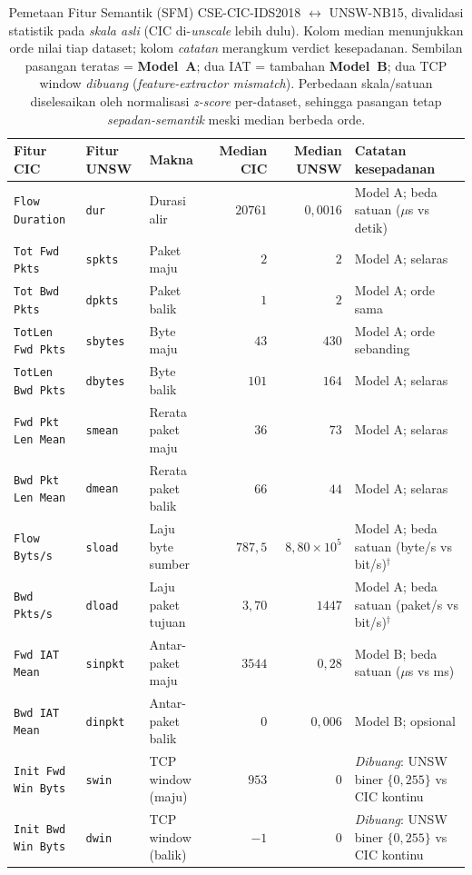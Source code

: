 \documentclass[11pt,a4paper]{article}
\begin{document}
\begin{table}[t]
\centering
\caption{Pemetaan Fitur Semantik (SFM) CSE-CIC-IDS2018 $\leftrightarrow$
UNSW-NB15, divalidasi statistik pada \emph{skala asli} (CIC di-\emph{unscale}
lebih dulu). Kolom median menunjukkan orde nilai tiap dataset; kolom
\emph{catatan} merangkum verdict kesepadanan. Sembilan pasangan teratas =
\textbf{Model~A}; dua IAT = tambahan \textbf{Model~B}; dua TCP window
\emph{dibuang} (\emph{feature-extractor mismatch}). Perbedaan skala/satuan
diselesaikan oleh normalisasi \emph{z-score} per-dataset, sehingga pasangan
tetap \emph{sepadan-semantik} meski median berbeda orde.}
\label{tab:sfm}
\small
\begin{tabular}{lllrrl}
\toprule
Fitur CIC & Fitur UNSW & Makna & Median CIC & Median UNSW & Catatan kesepadanan \\
\midrule
\texttt{Flow Duration}     & \texttt{dur}    & Durasi alir & $20761$ & $0{,}0016$ & Model A; beda satuan ($\mu$s vs detik) \\
\texttt{Tot Fwd Pkts}      & \texttt{spkts}  & Paket maju  & $2$ & $2$ & Model A; selaras \\
\texttt{Tot Bwd Pkts}      & \texttt{dpkts}  & Paket balik & $1$ & $2$ & Model A; orde sama \\
\texttt{TotLen Fwd Pkts}   & \texttt{sbytes} & Byte maju   & $43$ & $430$ & Model A; orde sebanding \\
\texttt{TotLen Bwd Pkts}   & \texttt{dbytes} & Byte balik  & $101$ & $164$ & Model A; selaras \\
\texttt{Fwd Pkt Len Mean}  & \texttt{smean}  & Rerata paket maju  & $36$ & $73$ & Model A; selaras \\
\texttt{Bwd Pkt Len Mean}  & \texttt{dmean}  & Rerata paket balik & $66$ & $44$ & Model A; selaras \\
\texttt{Flow Byts/s}       & \texttt{sload}  & Laju byte sumber & $787{,}5$ & $8{,}80{\times}10^{5}$ & Model A; beda satuan (byte/s vs bit/s)$^\dagger$ \\
\texttt{Bwd Pkts/s}        & \texttt{dload}  & Laju paket tujuan & $3{,}70$ & $1447$ & Model A; beda satuan (paket/s vs bit/s)$^\dagger$ \\
\midrule
\texttt{Fwd IAT Mean}      & \texttt{sinpkt} & Antar-paket maju  & $3544$ & $0{,}28$ & Model B; beda satuan ($\mu$s vs ms) \\
\texttt{Bwd IAT Mean}      & \texttt{dinpkt} & Antar-paket balik & $0$ & $0{,}006$ & Model B; opsional \\
\midrule
\texttt{Init Fwd Win Byts} & \texttt{swin}   & TCP window (maju)  & $953$ & $0$ & \emph{Dibuang}: UNSW biner $\{0,255\}$ vs CIC kontinu \\
\texttt{Init Bwd Win Byts} & \texttt{dwin}   & TCP window (balik) & $-1$ & $0$ & \emph{Dibuang}: UNSW biner $\{0,255\}$ vs CIC kontinu \\
\bottomrule
\end{tabular}


\end{table}
\end{document}
